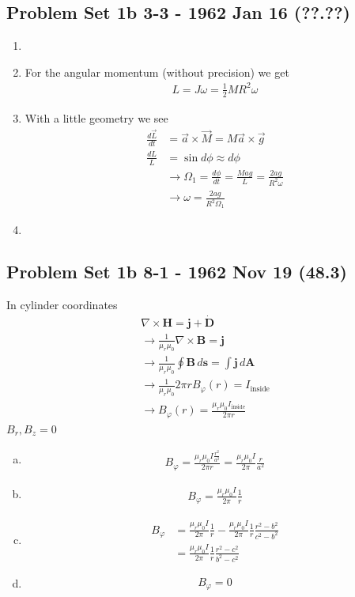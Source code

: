 \documentclass[../main.tex]{subfiles}
\begin{document}
\subsection{Problem Set 1b 3-3 - 1962 Jan 16 (??.??)}
\begin{enumerate}
    \item 
    \item For the angular momentum (without precision) we get
    \begin{align}
        L=J\omega=\frac{1}{2}MR^2\omega
    \end{align}
    \item With a little geometry we see
    \begin{align}
        \frac{d\vec{L}}{dt}&=\vec{a}\times\vec{M}=M\vec{a}\times\vec{g}\\
        \frac{dL}{L}&=\sin d\phi\approx d\phi\\
        &\rightarrow\Omega_1=\frac{d\phi}{dt}=\frac{Mag}{L}=\frac{2ag}{R^2\omega}\\
        &\rightarrow\omega=\frac{2ag}{R^2\Omega_1}
    \end{align}
    \item
\end{enumerate}

\subsection{Problem Set 1b 8-1 - 1962 Nov 19 (48.3)}
In cylinder coordinates
\begin{align}
\nabla\times\mathbf{H}=\mathbf{j}+\dot{\mathbf{D}}\\
\rightarrow\frac{1}{\mu_r\mu_0}\nabla\times\mathbf{B}=\mathbf{j}\\
\rightarrow\frac{1}{\mu_r\mu_0}\oint \mathbf{B}\,d\mathbf{s}=\int\mathbf{j}\,d\mathbf{A}\\
\rightarrow\frac{1}{\mu_r\mu_0}2\pi r B_\varphi(r)=I_\text{inside}\\
\rightarrow B_\varphi(r)=\frac{\mu_r\mu_0I_\text{inside}}{2\pi r}
\end{align}
$B_r,B_z=0$
\begin{enumerate}[(a)]
\item
\begin{align}
B_\varphi=\frac{\mu_r\mu_0I\frac{r^2}{a^2}}{2\pi r }=\frac{\mu_r\mu_0I}{2\pi}\frac{r}{a^2}
\end{align}
\item
\begin{align}
B_\varphi=\frac{\mu_r\mu_0I}{2\pi}\frac{1}{r}
\end{align}
\item
\begin{align}
B_\varphi&=\frac{\mu_r\mu_0I}{2\pi}\frac{1}{r}-\frac{\mu_r\mu_0I}{2\pi}\frac{1}{r}\frac{r^2-b^2}{c^2-b^2}\\
&=\frac{\mu_r\mu_0I}{2\pi}\frac{1}{r}\frac{r^2-c^2}{b^2-c^2}
\end{align}
\item
\begin{align}
B_\varphi=0
\end{align}
\end{enumerate}
\end{document}
